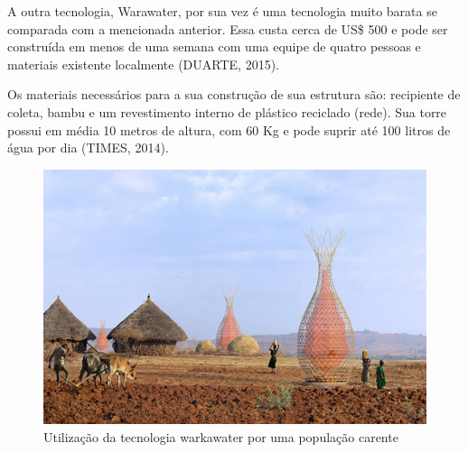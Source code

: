 \documentclass[12pt,openright,oneside,a4paper,brazil]{abntex2}
\begin{document}
A outra tecnologia, Warawater, por sua vez é uma tecnologia muito barata se comparada com a mencionada anterior. Essa custa cerca de US\$ 500 e pode ser construída em menos de uma semana com uma equipe de quatro pessoas e materiais existente localmente (DUARTE, 2015).

	Os materiais necessários para a sua construção de sua estrutura são: recipiente de coleta, bambu e um revestimento interno de plástico reciclado (rede). Sua torre possui em média 10 metros de altura, com 60 Kg e pode suprir até 100 litros de água por dia (TIMES, 2014).
\begin{figure}[!htbp]
\centering
\includegraphics[scale=0.3]{warkawater}
\caption[Caption title in LOF]{Utilização da tecnologia warkawater por uma população carente  \footnotemark}
\FloatBarrier
\label{Especificacoes}
\end{figure}



\end{document}
